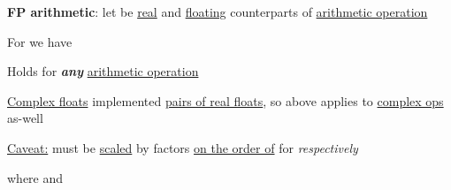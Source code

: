 \hSep %

\textbf{FP arithmetic}: let \iMbox{\ast, \circledast} be \underline{real} and
\underline{floating} counterparts of \underline{arithmetic operation}

\begin{itemize}
      \vItem
            For  we have

            \begin{itemize}
                  \vItem
                        Holds for \textbf{\emph{any}} \underline{arithmetic operation}
                        \iMbox{\circledast = \oplus, \ominus, \otimes, \oslash}
            \end{itemize}
      \vItem
            \underline{Complex floats} implemented \underline{pairs of real floats}, so above applies
            to \underline{complex ops} as-well

            \begin{itemize}
                  \vItem
                        \underline{Caveat:} 
                        must be \underline{scaled} by factors \underline{on the order of} 
                        for \iMbox{\otimes, \oslash} \emph{respectively}
            \end{itemize}
      \vItem
      \vItem
      \vItem
            where
            and

            \begin{itemize}


\end{itemize}
\end{itemize}
